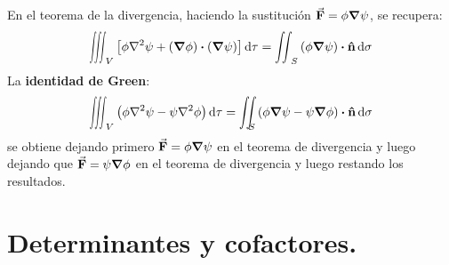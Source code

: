 \documentclass[hidelinks,12pt]{article}
\def\scaleiint#1{\vcenter{\hbox{\scaleto[3ex]{\displaystyle\iint}{#1}}}}
\def\scaleiiint#1{\vcenter{\hbox{\scaleto[3ex]{\displaystyle\iiint}{#1}}}}
\def\bs{\mkern-12mu}
\begin{document}
En el teorema de la divergencia, haciendo la sustitución $\va{F} = \phi \grad{\psi}$, se recupera:
\begin{align*}
\scaleiiint{6ex}_{V} \left[ \phi \laplacian{\psi} + \left( \gradient{\phi} \right) \vdot \left( \gradient{\psi} \right) \right] \dd{\tau} = \scaleiint{6ex}_{S} \left( \phi \gradient{\psi} \right) \vdot \vu{n} \dd{\sigma}
\end{align*}
La \textbf{identidad de Green}:
\begin{align*}
\scaleiiint{6ex}_{V} \left( \phi \laplacian{\psi} - \psi \laplacian{\phi} \right) \dd{\tau} = \scaleiint{6ex}_{\bs S} \left( \phi \gradient{\psi} - \psi \gradient{\phi} \right) \vdot \vu{n} \dd{\sigma}
\end{align*}
se obtiene dejando primero $\va{F} = \phi \gradient{\psi}$ en el teorema de divergencia y luego dejando que $\va{F} = \psi \gradient{\phi}$ en el teorema de divergencia y luego restando los resultados.

\section{Determinantes y cofactores.}
\end{document}
